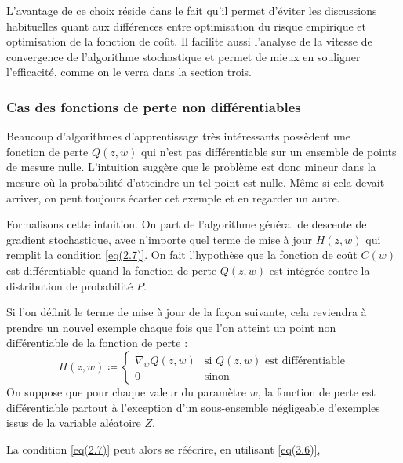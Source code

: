 \documentclass{article}
\begin{document}
L'avantage de ce choix réside dans le fait qu'il permet d'éviter les discussions habituelles quant aux différences entre optimisation du risque empirique et optimisation de la fonction de coût. Il facilite aussi l'analyse de la vitesse de convergence de l'algorithme stochastique et permet de mieux en souligner l'efficacité, comme on le verra dans la section trois. 
\bigskip

\subsubsection{Cas des fonctions de perte non différentiables}

Beaucoup d'algorithmes d'apprentissage très intéressants possèdent une \\ fonction de perte $Q(z, w)$ qui n'est pas différentiable sur un ensemble de points de mesure nulle. L'intuition suggère que le problème est donc mineur dans la mesure où la probabilité d'atteindre un tel point est nulle. Même si cela devait arriver, on peut toujours écarter cet exemple et en regarder un autre.
\bigskip

Formalisons cette intuition. On part de l'algorithme général de descente de gradient stochastique, avec n'importe quel terme de mise à jour $H(z, w)$ qui remplit la condition \eqref{eq(2.7)}. On fait l'hypothèse que la fonction de coût $C(w)$ est différentiable quand la fonction de perte $Q(z, w)$ est intégrée contre la distribution de probabilité $P$.  
\bigskip

Si l'on définit le terme de mise à jour de la façon suivante, cela reviendra à prendre un nouvel exemple chaque fois que l'on atteint un point non différentiable de la fonction de perte :  
\begin{equation}
    H(z, w) \coloneqq
        \left\{
            \begin{array}{ll} \label{eq(3.6)}
                 \nabla_w Q(z, w) & \text{si } Q(z, w) \text{ est différentiable} \\ 
                 0 & \text{sinon} 
            \end{array}
    \right.
\end{equation}
On suppose que pour chaque valeur du paramètre $w$, la fonction de perte est différentiable partout à l'exception d'un sous-ensemble négligeable d'exemples issus de la variable aléatoire $Z$.

La condition \eqref{eq(2.7)} peut alors se réécrire, en utilisant \eqref{eq(3.6)}, 
\end{document}

